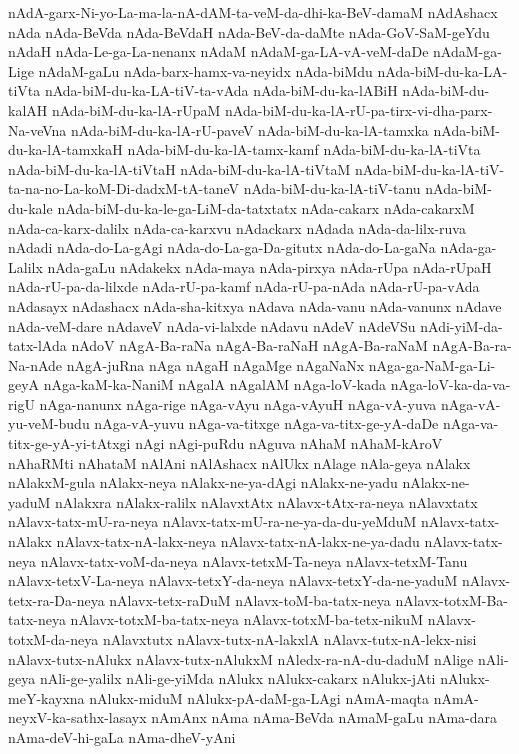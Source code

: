 {nAdA-garx-Ni-yo-La-ma-la-nA-dAM-ta-veM-da-dhi-ka-BeV-damaM
nAdAshacx
nAda
nAda-BeVda
nAda-BeVdaH
nAda-BeV-da-daMte
nAda-GoV-SaM-geYdu
nAdaH
nAda-Le-ga-La-nenanx
nAdaM
nAdaM-ga-LA-vA-veM-daDe
nAdaM-ga-Lige
nAdaM-gaLu
nAda-barx-hamx-va-neyidx
nAda-biMdu
nAda-biM-du-ka-LA-tiVta
nAda-biM-du-ka-LA-tiV-ta-vAda
nAda-biM-du-ka-lABiH
nAda-biM-du-kalAH
nAda-biM-du-ka-lA-rUpaM
nAda-biM-du-ka-lA-rU-pa-tirx-vi-dha-parx-Na-veVna
nAda-biM-du-ka-lA-rU-paveV
nAda-biM-du-ka-lA-tamxka
nAda-biM-du-ka-lA-tamxkaH
nAda-biM-du-ka-lA-tamx-kamf
nAda-biM-du-ka-lA-tiVta
nAda-biM-du-ka-lA-tiVtaH
nAda-biM-du-ka-lA-tiVtaM
nAda-biM-du-ka-lA-tiV-ta-na-no-La-koM-Di-dadxM-tA-taneV
nAda-biM-du-ka-lA-tiV-tanu
nAda-biM-du-kale
nAda-biM-du-ka-le-ga-LiM-da-tatxtatx
nAda-cakarx
nAda-cakarxM
nAda-ca-karx-dalilx
nAda-ca-karxvu
nAdackarx
nAdada
nAda-da-lilx-ruva
nAdadi
nAda-do-La-gAgi
nAda-do-La-ga-Da-gitutx
nAda-do-La-gaNa
nAda-ga-Lalilx
nAda-gaLu
nAdakekx
nAda-maya
nAda-pirxya
nAda-rUpa
nAda-rUpaH
nAda-rU-pa-da-lilxde
nAda-rU-pa-kamf
nAda-rU-pa-nAda
nAda-rU-pa-vAda
nAdasayx
nAdashacx
nAda-sha-kitxya
nAdava
nAda-vanu
nAda-vanunx
nAdave
nAda-veM-dare
nAdaveV
nAda-vi-lalxde
nAdavu
nAdeV
nAdeVSu
nAdi-yiM-da-tatx-lAda
nAdoV
nAgA-Ba-raNa
nAgA-Ba-raNaH
nAgA-Ba-raNaM
nAgA-Ba-ra-Na-nAde
nAgA-juRna
nAga
nAgaH
nAgaMge
nAgaNaNx
nAga-ga-NaM-ga-Li-geyA
nAga-kaM-ka-NaniM
nAgalA
nAgalAM
nAga-loV-kada
nAga-loV-ka-da-va-rigU
nAga-nanunx
nAga-rige
nAga-vAyu
nAga-vAyuH
nAga-vA-yuva
nAga-vA-yu-veM-budu
nAga-vA-yuvu
nAga-va-titxge
nAga-va-titx-ge-yA-daDe
nAga-va-titx-ge-yA-yi-tAtxgi
nAgi
nAgi-puRdu
nAguva
nAhaM
nAhaM-kAroV
nAhaRMti
nAhataM
nAlAni
nAlAshacx
nAlUkx
nAlage
nAla-geya
nAlakx
nAlakxM-gula
nAlakx-neya
nAlakx-ne-ya-dAgi
nAlakx-ne-yadu
nAlakx-ne-yaduM
nAlakxra
nAlakx-ralilx
nAlavxtAtx
nAlavx-tAtx-ra-neya
nAlavxtatx
nAlavx-tatx-mU-ra-neya
nAlavx-tatx-mU-ra-ne-ya-da-du-yeMduM
nAlavx-tatx-nAlakx
nAlavx-tatx-nA-lakx-neya
nAlavx-tatx-nA-lakx-ne-ya-dadu
nAlavx-tatx-neya
nAlavx-tatx-voM-da-neya
nAlavx-tetxM-Ta-neya
nAlavx-tetxM-Tanu
nAlavx-tetxV-La-neya
nAlavx-tetxY-da-neya
nAlavx-tetxY-da-ne-yaduM
nAlavx-tetx-ra-Da-neya
nAlavx-tetx-raDuM
nAlavx-toM-ba-tatx-neya
nAlavx-totxM-Ba-tatx-neya
nAlavx-totxM-ba-tatx-neya
nAlavx-totxM-ba-tetx-nikuM
nAlavx-totxM-da-neya
nAlavxtutx
nAlavx-tutx-nA-lakxlA
nAlavx-tutx-nA-lekx-nisi
nAlavx-tutx-nAlukx
nAlavx-tutx-nAlukxM
nAledx-ra-nA-du-daduM
nAlige
nAli-geya
nAli-ge-yalilx
nAli-ge-yiMda
nAlukx
nAlukx-cakarx
nAlukx-jAti
nAlukx-meY-kayxna
nAlukx-miduM
nAlukx-pA-daM-ga-LAgi
nAmA-maqta
nAmA-neyxV-ka-sathx-lasayx
nAmAnx
nAma
nAma-BeVda
nAmaM-gaLu
nAma-dara
nAma-deV-hi-gaLa
nAma-dheV-yAni
}
